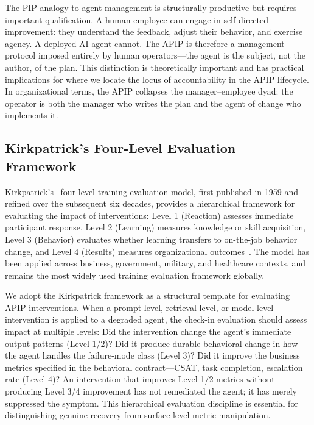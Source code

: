 The PIP analogy to agent management is structurally productive but requires
important qualification. A human employee can engage in self-directed
improvement: they understand the feedback, adjust their behavior, and exercise
agency. A deployed AI agent cannot. The APIP is therefore a management protocol
imposed entirely by human operators---the agent is the subject, not the author,
of the plan. This distinction is theoretically important and has practical
implications for where we locate the locus of accountability in the APIP
lifecycle. In organizational terms, the APIP collapses the manager--employee
dyad: the operator is both the manager who writes the plan and the agent of
change who implements it.

\subsection{Kirkpatrick's Four-Level Evaluation Framework}
\label{subsec:kirkpatrick}

Kirkpatrick's~\cite{kirkpatrick1994evaluating} four-level training evaluation
model, first published in 1959 and refined over the subsequent six decades,
provides a hierarchical framework for evaluating the impact of interventions:
Level 1 (Reaction) assesses immediate participant response, Level 2 (Learning)
measures knowledge or skill acquisition, Level 3 (Behavior) evaluates whether
learning transfers to on-the-job behavior change, and Level 4 (Results)
measures organizational outcomes~\cite{kirkpatrick1994evaluating,kirkpatrick2016four}.
The model has been applied across business, government, military, and
healthcare contexts, and remains the most widely used training evaluation
framework globally.

We adopt the Kirkpatrick framework as a structural template for evaluating APIP
interventions. When a prompt-level, retrieval-level, or model-level
intervention is applied to a degraded agent, the check-in evaluation should
assess impact at multiple levels: Did the intervention change the agent's
immediate output patterns (Level 1/2)? Did it produce durable behavioral change
in how the agent handles the failure-mode class (Level 3)? Did it improve the
business metrics specified in the behavioral contract---CSAT, task completion,
escalation rate (Level 4)? An intervention that improves Level 1/2 metrics
without producing Level 3/4 improvement has not remediated the agent; it has
merely suppressed the symptom. This hierarchical evaluation discipline is
essential for distinguishing genuine recovery from surface-level metric
manipulation.

